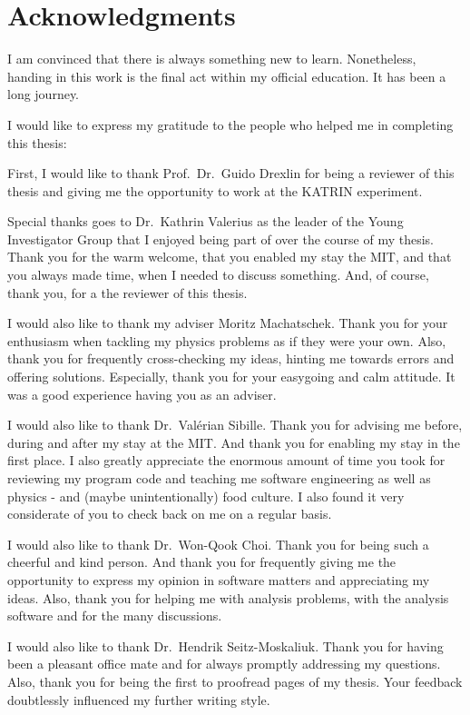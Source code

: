 \chapter*{Acknowledgments}
I am convinced that there is always something new to learn. Nonetheless, handing in this work is the final act within my official education. It has been a long journey. 

I would like to express my gratitude to the people who helped me in completing this thesis:

First, I would like to thank Prof.~Dr.~Guido Drexlin for being a reviewer of this thesis and giving me the opportunity to work at the KATRIN experiment.

Special thanks goes to Dr.~Kathrin Valerius as the leader of the Young Investigator Group that I enjoyed being part of over the course of my thesis. Thank you for the warm welcome, that you enabled my stay the MIT, and that you always made time, when I needed to discuss something. And, of course, thank you, for a the reviewer of this thesis. 

I would also like to thank my adviser Moritz Machatschek. Thank you for your enthusiasm when tackling my physics problems as if they were your own. Also, thank you for frequently cross-checking my ideas, hinting me towards errors and offering solutions. Especially, thank you for your easygoing and calm attitude. It was a good experience having you as an adviser.

I would also like to thank Dr.~Valérian Sibille. Thank you for advising me before, during and after my stay at the MIT. And thank you for enabling my stay in the first place. I also greatly appreciate the enormous amount of time you took for reviewing my program code and teaching me software engineering as well as physics - and (maybe unintentionally) food culture. I also found it very considerate of you to check back on me on a regular basis.

I would also like to thank Dr.~Won-Qook Choi. Thank you for being such a cheerful and kind person. And thank you for frequently giving me the opportunity to express my opinion in software matters and appreciating my ideas. Also, thank you for helping me with analysis problems, with the analysis software and for the many discussions.


I would also like to thank Dr.~Hendrik Seitz-Moskaliuk. Thank you for having been a pleasant office mate and for always promptly addressing my questions. Also, thank you for being the first to proofread pages of my thesis. Your feedback doubtlessly influenced my further writing style.

